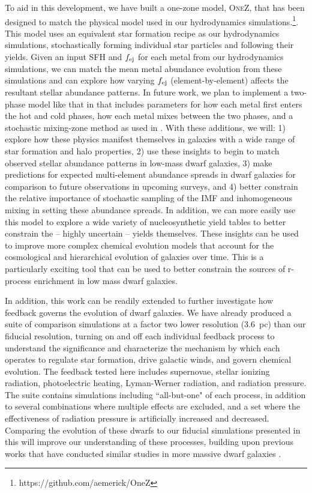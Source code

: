 To aid in this development, we have built a one-zone model, \textsc{OneZ}, that has been designed to match the physical model used in our hydrodynamics simulations.\footnote{https://github.com/aemerick/OneZ}. This model uses an equivalent star formation recipe as our hydrodynamics simulations, stochastically forming individual star particles and following their yields. Given an input SFH and $f_{\rm ej}$ for each metal from our hydrodynamics simulations, we can match the mean metal abundance evolution from these simulations and can explore how varying $f_{\rm ej}$ (element-by-element) affects the resultant stellar abundance patterns. In future work, we plan to implement a two-phase model like that in \cite{SchonrichWeinberg2019} that includes parameters for how each metal first enters the hot and cold phases, how each metal mixes between the two phases, and a stochastic mixing-zone method as used in \cite{Cescutti2008}. With these additions, we will: 1) explore how these physics manifest themselves in galaxies with a wide range of star formation and halo properties, 2) use these insights to begin to match observed stellar abundance patterns in low-mass dwarf galaxies, 3) make predictions for expected multi-element abundance spreads in dwarf galaxies for comparison to future observations in upcoming surveys, and 4) better constrain the relative importance of stochastic sampling of the IMF and inhomogeneous mixing in setting these abundance spreads. In addition, we can more easily use this model to explore a wide variety of nucleosynthetic yield tables to better constrain the -- highly uncertain -- yields themselves. These insights can be used to improve more complex chemical evolution models that account for the cosmological and hierarchical evolution of galaxies over time. This is a particularly exciting tool that can be used to better constrain the sources of r-process enrichment in low mass dwarf galaxies.

In addition, this work can be readily extended to further investigate how feedback governs the evolution of dwarf galaxies. We have already produced a suite of comparison simulations at a factor two lower resolution (3.6~pc) than our fiducial resolution, turning on and off each individual feedback process to understand the significance and characterize the mechanism by which each operates to regulate star formation, drive galactic winds, and govern chemical evolution. The feedback tested here includes supernovae, stellar ionizing radiation, photoelectric heating, Lyman-Werner radiation, and radiation pressure. The suite contains simulations including ``all-but-one" of each process, in addition to several combinations where multiple effects are excluded, and a set where the effectiveness of radiation pressure is artificially increased and decreased. Comparing the evolution of these dwarfs to our fiducial simulations presented in this \dissertation will improve our understanding of these processes, building upon previous works that have conducted similar studies in more massive dwarf galaxies \citep{Hu2016,Hu2017,Forbes2016,Hopkins2018}.

